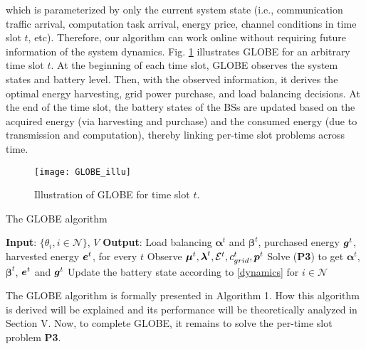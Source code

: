 \documentclass[12pt, draftclsnofoot, letterpaper, onecolumn]{IEEEtran}
\begin{document}
which is parameterized by only the current system state (i.e., communication traffic arrival, computation task arrival, energy price, channel conditions in time slot $t$, etc). Therefore, our algorithm can work online without requiring future information of the system dynamics. Fig. \ref{fig:globeillu} illustrates GLOBE for an arbitrary time slot $t$. At the beginning of each time slot, GLOBE observes the system states and battery level. Then, with the observed information, it derives the optimal energy harvesting, grid power purchase, and load balancing decisions. At the end of the time slot, the battery states of the BSs are updated based on the acquired energy (via harvesting and purchase) and the consumed energy (due to transmission and computation), thereby linking per-time slot problems across time.
\begin{figure}[htb]
	\centering
	\texttt{[image: GLOBE\_illu]}
	\caption{Illustration of GLOBE for time slot $t$.}
	\label{fig:globeillu}
\vspace{-20pt}
\end{figure}

\begin{algorithm}[htb]
	\caption{The GLOBE algorithm}
	\begin{algorithmic}[1]
		\State \textbf{Input}: $\{\theta_i,  i \in \mathcal{N}\}$, $V$
		\State \textbf{Output}: Load balancing $\bm\alpha^t$ and $\bm\beta^t$, purchased energy ${\boldsymbol{g}}^t$, harvested energy ${\boldsymbol{e}}^t$, for every $t$
		\State Observe $\mbox{\boldmath $\mu$}^t, \mbox{\boldmath $\lambda$}^t, \mathcal{E}^t, c^t_{grid}, {\boldsymbol{p}}^t$
		\State Solve (\textbf{P3}) to get $\bm\alpha^t$, $\bm\beta^t$, ${\boldsymbol{e}}^t$ and ${\boldsymbol{g}}^t$
		\State Update the battery state according to \eqref{dynamics} for $i \in \mathcal{N}$
		\EndFor
	\end{algorithmic}
\end{algorithm}


The GLOBE algorithm is formally presented in Algorithm 1. How this algorithm is derived will be explained and its performance will be theoretically analyzed in Section V. Now, to complete GLOBE, it remains to solve the per-time slot problem \textbf{P3}.
\end{document}
